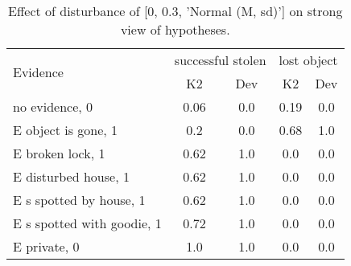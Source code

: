 \begin{table}\begin{tabular}{l|cc|cc}\toprule\multirow{2}{*}{Evidence} & \multicolumn{2}{c}{successful stolen}& \multicolumn{2}{c}{lost object}\\& {K2} & {Dev}& {K2} & {Dev}\\\midrule
no evidence, 0 & \cellcolor{Bittersweet}0.06&\cellcolor{Bittersweet}0.0&\cellcolor{Bittersweet}0.19&\cellcolor{Bittersweet}0.0\\E object is gone, 1 & \cellcolor{Bittersweet}0.2&\cellcolor{Bittersweet}0.0&\cellcolor{Bittersweet}0.68&\cellcolor{Bittersweet}1.0\\E broken lock, 1 & \cellcolor{Bittersweet}0.62&\cellcolor{Bittersweet}1.0&\cellcolor{Bittersweet}0.0&\cellcolor{Bittersweet}0.0\\E disturbed house, 1 & \cellcolor{Bittersweet}0.62&\cellcolor{Bittersweet}1.0&\cellcolor{Bittersweet}0.0&\cellcolor{Bittersweet}0.0\\E s spotted by house, 1 & \cellcolor{Bittersweet}0.62&\cellcolor{Bittersweet}1.0&\cellcolor{Bittersweet}0.0&\cellcolor{Bittersweet}0.0\\E s spotted with goodie, 1 & \cellcolor{Bittersweet}0.72&\cellcolor{Bittersweet}1.0&\cellcolor{Bittersweet}0.0&\cellcolor{Bittersweet}0.0\\E private, 0 & \cellcolor{Bittersweet}1.0&\cellcolor{Bittersweet}1.0&\cellcolor{Bittersweet}0.0&\cellcolor{Bittersweet}0.0\\\bottomrule\end{tabular}\caption{Effect of disturbance of [0, 0.3, 'Normal (M, sd)'] on strong view of hypotheses.}\end{table}